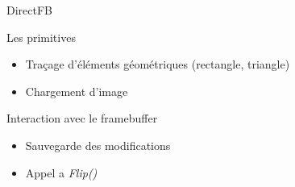 
\begin{frame}{DirectFB}
	\begin{block} { Les primitives }
		\begin{itemize}
			\item Traçage d'éléments géométriques (rectangle, triangle)
			\item Chargement d'image
		\end{itemize}
	\end{block}
	\begin{block} { Interaction avec le framebuffer }
		 \begin{itemize}
		 	\item Sauvegarde des modifications%
		 	\item Appel a \emph{Flip()} 
		 \end{itemize}
	\end{block}
\end{frame}
